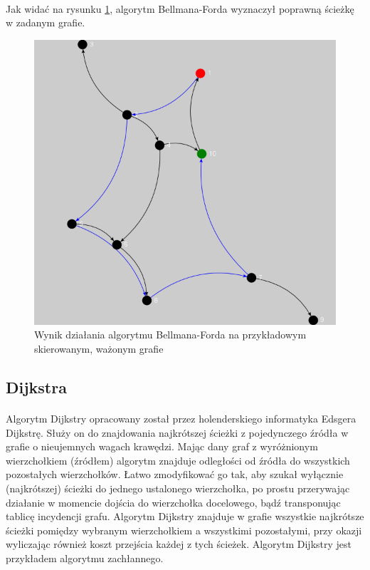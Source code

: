 \paragraph{}
Jak widać na rysunku \ref{fig:bellmanFord}, algorytm Bellmana-Forda wyznaczył poprawną ścieżkę w zadanym grafie.

\begin{figure}[!h]
 \centering
 \includegraphics{algorithms/bellmanFord}
 \caption{Wynik działania algorytmu Bellmana-Forda na przykładowym skierowanym, ważonym grafie}
 \label{fig:bellmanFord}
\end{figure}

\subsection{Dijkstra}
\paragraph{}
Algorytm Dijkstry opracowany został przez holenderskiego informatyka Edsgera Dijkstrę.
Służy on do znajdowania najkrótszej ścieżki z pojedynczego źródła w grafie o nieujemnych wagach krawędzi.
Mając dany graf z wyróżnionym wierzchołkiem (źródłem) algorytm znajduje odległości od źródła do wszystkich pozostałych wierzchołków. 
Łatwo zmodyfikować go tak, aby szukał wyłącznie (najkrótszej) ścieżki do jednego ustalonego wierzchołka, po prostu przerywając działanie w momencie
dojścia do wierzchołka docelowego, bądź transponując tablicę incydencji grafu.
Algorytm Dijkstry znajduje w grafie wszystkie najkrótsze ścieżki pomiędzy wybranym wierzchołkiem a wszystkimi pozostałymi, przy okazji wyliczając
również koszt przejścia każdej z tych ścieżek.
Algorytm Dijkstry jest przykładem algorytmu zachłannego.


